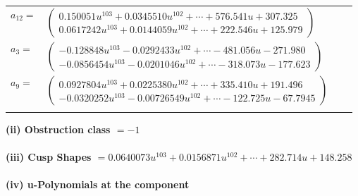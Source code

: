 \documentclass[1p]{elsarticle_modified}
\theoremstyle{definition}
\begin{document}
\begin{tabular}{m{7pt} m{180pt} m{7pt} m{180pt} }
\flushright $a_{12}=$&$\begin{pmatrix}0.150051 u^{103}+0.0345510 u^{102}+\cdots+576.541 u+307.325\\0.0617242 u^{103}+0.0144059 u^{102}+\cdots+222.546 u+125.979\end{pmatrix}$ \\
\flushright $a_{3}=$&$\begin{pmatrix}-0.128848 u^{103}-0.0292433 u^{102}+\cdots-481.056 u-271.980\\-0.0856454 u^{103}-0.0201046 u^{102}+\cdots-318.073 u-177.623\end{pmatrix}$ \\
\flushright $a_{9}=$&$\begin{pmatrix}0.0927804 u^{103}+0.0225380 u^{102}+\cdots+335.410 u+191.496\\-0.0320252 u^{103}-0.00726549 u^{102}+\cdots-122.725 u-67.7945\end{pmatrix}$\\&\end{tabular}
\flushleft \textbf{(ii) Obstruction class $= -1$}\\~\\
\flushleft \textbf{(iii) Cusp Shapes $= 0.0640073 u^{103}+0.0156871 u^{102}+\cdots+282.714 u+148.258$}\\~\\
\newpage\renewcommand{\arraystretch}{1}
\flushleft \textbf{(iv) u-Polynomials at the component}\newline \\
\end{document}
